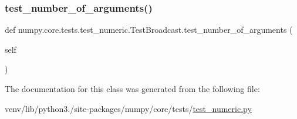 \mbox{\label{classnumpy_1_1core_1_1tests_1_1test__numeric_1_1TestBroadcast_a333e2493247ad93fad9bf05dde9e81dc}} 
\subsubsection{\texorpdfstring{test\+\_\+number\+\_\+of\+\_\+arguments()}{test\_number\_of\_arguments()}}
{\footnotesize\ttfamily def numpy.\+core.\+tests.\+test\+\_\+numeric.\+Test\+Broadcast.\+test\+\_\+number\+\_\+of\+\_\+arguments (\begin{DoxyParamCaption}\item[{}]{self }\end{DoxyParamCaption})}



The documentation for this class was generated from the following file\+:\begin{DoxyCompactItemize}
\item 
venv/lib/python3./site-\/packages/numpy/core/tests/\hyperlink{core_2tests_2test__numeric_8py}{test\+\_\+numeric.\+py}\end{DoxyCompactItemize}
